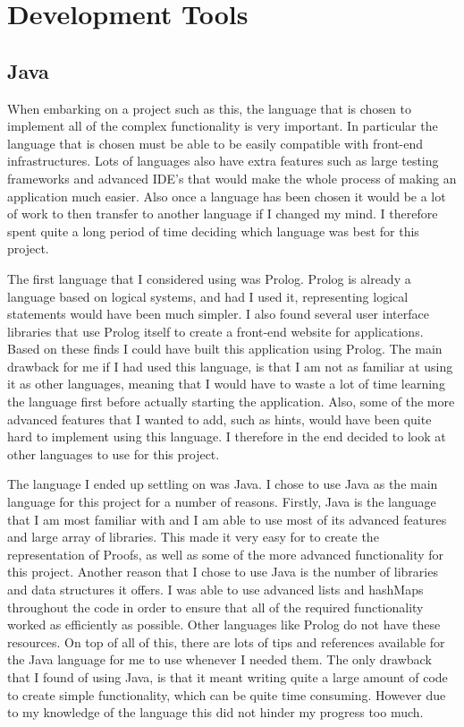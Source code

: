 \section{Development Tools}

\subsection{Java}

When embarking on a project such as this, the language that is chosen to implement all of the complex functionality is very important. In particular the language that is chosen must be able to be easily compatible with front-end infrastructures. Lots of languages also have extra features such as large testing frameworks and advanced IDE's that would make the whole process of making an application much easier. Also once a language has been chosen it would be a lot of work to then transfer to another language if I changed my mind. I therefore spent quite a long period of time deciding which language was best for this project.

The first language that I considered using was Prolog. Prolog is already a language based on logical systems, and had I used it, representing logical statements would have been much simpler. I also found several user interface libraries that use Prolog itself to create a front-end website for applications. Based on these finds I could have built this application using Prolog. The main drawback for me if I had used this language, is that I am not as familiar at using it as other languages, meaning that I would have to waste a lot of time learning the language first before actually starting the application. Also, some of the more advanced features that I wanted to add, such as hints, would have been quite hard to implement using this language. I therefore in the end decided to look at other languages to use for this project. 

The language I ended up settling on was Java. I chose to use Java as the main language for this project for a number of reasons. Firstly, Java is the language that I am most familiar with and I am able to use most of its advanced features and large array of libraries. This made it very easy for to create the representation of Proofs, as well as some of the more advanced functionality for this project. Another reason that I chose to use Java is the number of libraries and data structures it offers. I was able to use advanced lists and hashMaps throughout the code in order to ensure that all of the required functionality worked as efficiently as possible. Other languages like Prolog do not have these resources. On top of all of this, there are lots of tips and references available for the Java language for me to use whenever I needed them. The only drawback that I found of using Java, is that it meant writing quite a large amount of code to create simple functionality, which can be quite time consuming. However due to my knowledge of the language this did not hinder my progress too much. 


